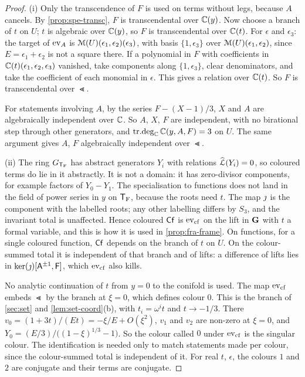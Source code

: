 \begin{proof}
(i) Only the transcendence of $F$ is used on terms without legs, because $A$ cancels. By \cref{prop:spe-transc}, $F$ is transcendental over $\mathbb{C}(y)$. Now choose a branch of $t$ on $U$; $t$ is algebraic over $\mathbb{C}(y)$, so $F$ is transcendental over $\mathbb{C}(t)$. For $\epsilon$ and $\epsilon_3$: the target of $\mathrm{ev}_{A}$ is $\mathcal{M}(U)(\epsilon_1,\epsilon_2)(\epsilon_3)$, with basis $\{1,\epsilon_3\}$ over $\mathcal{M}(U)(\epsilon_1,\epsilon_2)$, since $E=\epsilon_1+\epsilon_2$ is not a square there. If a polynomial in $F$ with coefficients in $\mathbb{C}(t)(\epsilon_1,\epsilon_2,\epsilon_3)$ vanished, take components along $\{1,\epsilon_3\}$, clear denominators, and take the coefficient of each monomial in $\epsilon$. This gives a relation over $\mathbb{C}(t)$. So $F$ is transcendental over $\Lt$.

For statements involving $A$, by \cite[Lemma~4.2]{BFGW21} the series $F-(X-1)/3$, $X$ and $A$ are algebraically independent over $\mathbb{C}$. So $A$, $X$, $F$ are independent, with no birational step through other generators, and $\mathrm{tr.deg}_{\mathbb{C}}\,\mathbb{C}(y,A,F)=3$ on $U$. The same argument gives $A$, $F$ algebraically independent over $\Lt$.

(ii) The ring $G_{\mathsf{T}_{\mathrm{F}}}$ has abstract generators $Y_i$ with relations $\widehat{\mathcal{L}}(Y_i)=0$, so coloured terms do lie in it abstractly. It is not a domain: it has zero-divisor components, for example factors of $Y_0-Y_1$. The specialisation to functions does not land in the field of power series in $y$ on $\mathsf{T}_{\mathrm{F}}$, because the roots need $t$. The map $\jmath$ is the component with the labelled roots; any other labelling differs by $S_3$, and the invariant total is unaffected. Hence coloured $\mathsf{Cf}$ is $\mathrm{ev}_{\mathrm{cf}}$ on the lift in $\mathbf{G}$ with $t$ a formal variable, and this is how it is used in \cref{prop:fra-frame}. On functions, for a single coloured function, $\mathsf{Cf}$ depends on the branch of $t$ on $U$. On the colour-summed total it is independent of that branch and of lifts: a difference of lifts lies in $\ker(\jmath)[\mathsf{A}^{\pm1},\mathsf{F}]$, which $\mathrm{ev}_{\mathrm{cf}}$ also kills.

No analytic continuation of $t$ from $y=0$ to the conifold is used. The map $\mathrm{ev}_{\mathrm{cf}}$ embeds $\Lt$ by the branch at $\xi=0$, which defines colour $0$. This is the branch of \cref{sec:set} and \cref{lem:set-coord}(b), with $t_i=\omega^it$ and $t\to-1/3$. There $v_0=(1+3t)/(Et)=-\xi/E+O(\xi^2)$, $v_1$ and $v_2$ are non-zero at $\xi=0$, and $Y_0=(E/3)/\big((1-\xi)^{1/3}-1\big)$. So the colour called $0$ under $\mathrm{ev}_{\mathrm{cf}}$ is the singular colour. The identification is needed only to match statements made per colour, since the colour-summed total is independent of it. For real $t$, $\epsilon$, the colours $1$ and $2$ are conjugate and their terms are conjugate.


\end{proof}
